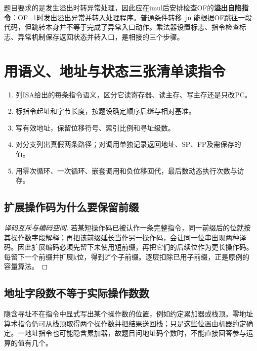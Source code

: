 题目要求的是发生溢出时转异常处理，因此应在imul后安排检查OF的\textbf{溢出自陷指令}：OF=1时发出溢出异常并转入处理程序。普通条件转移 \texttt{jo} 能根据OF跳往一段代码，但跳转本身并不等于完成了异常入口动作。乘法器设置标志、指令检查标志、异常机制保存返回状态并转入口，是相接的三个步骤。

\section{用语义、地址与状态三张清单读指令}\label{CO04-method}

\begin{methodbox}[机器级代码五步法]

\begin{enumerate}
\def\labelenumi{\arabic{enumi}.}
\tightlist
\item
  列ISA给出的每条指令语义，区分它读寄存器、读主存、写主存还是只改PC。
\item
  标指令起址和字节长度，按题设确定顺序后继与相对基准。
\item
  写有效地址，保留位移符号、索引比例和寻址级数。
\item
  对分支列出真假两条路径；对调用单独记录返回地址、SP、FP及需保存的值。
\item
  用零次循环、一次循环、嵌套调用和负位移回代，最后数动态执行次数与访存。
\end{enumerate}

\end{methodbox}

\subsection{扩展操作码为什么要保留前缀}\label{CO04-proof}

\begin{proof}[译码互斥与编码空间]

若某短操作码已被认作一条完整指令，同一前缀后的位就按其操作数字段解释；再把该前缀延长当作另一操作码，会让同一位串出现两种译码。因此扩展编码必须先留下未使用短前缀，再把它们的后续位作为更长操作码。每留下一个前缀并扩展k位，得到\(2^k\)个子前缀。逐层扣除已用子前缀，正是原例的容量算法。

\end{proof}

\subsection{地址字段数不等于实际操作数数}\label{CO04-implicit}

隐含寻址不在指令中显式写出某个操作数的位置，例如约定累加器或栈顶。零地址算术指令仍可从栈顶取得两个操作数并把结果送回栈；只是这些位置由机器约定确定。一地址指令也可能隐含累加器，故题目问地址码个数时，不能直接回答参与运算的值有几个。

